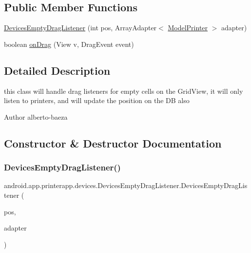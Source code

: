 \subsection*{Public Member Functions}
\begin{DoxyCompactItemize}
\item 
\hyperlink{classandroid_1_1app_1_1printerapp_1_1devices_1_1_devices_empty_drag_listener_abf707a0777082b12d84f259afb8f540e}{Devices\+Empty\+Drag\+Listener} (int pos, Array\+Adapter$<$ \hyperlink{classandroid_1_1app_1_1printerapp_1_1model_1_1_model_printer}{Model\+Printer} $>$ adapter)
\item 
boolean \hyperlink{classandroid_1_1app_1_1printerapp_1_1devices_1_1_devices_empty_drag_listener_ab25787587fe03762eae9e6ef3a689427}{on\+Drag} (View v, Drag\+Event event)
\end{DoxyCompactItemize}


\subsection{Detailed Description}
this class will handle drag listeners for empty cells on the Grid\+View, it will only listen to printers, and will update the position on the DB also \begin{DoxyAuthor}{Author}
alberto-\/baeza 
\end{DoxyAuthor}


\subsection{Constructor \& Destructor Documentation}
\mbox{\label{classandroid_1_1app_1_1printerapp_1_1devices_1_1_devices_empty_drag_listener_abf707a0777082b12d84f259afb8f540e}} 
\subsubsection{\texorpdfstring{Devices\+Empty\+Drag\+Listener()}{DevicesEmptyDragListener()}}
{\footnotesize\ttfamily android.\+app.\+printerapp.\+devices.\+Devices\+Empty\+Drag\+Listener.\+Devices\+Empty\+Drag\+Listener (\begin{DoxyParamCaption}\item[{int}]{pos,  }\item[{Array\+Adapter$<$ \hyperlink{classandroid_1_1app_1_1printerapp_1_1model_1_1_model_printer}{Model\+Printer} $>$}]{adapter }\end{DoxyParamCaption})}

